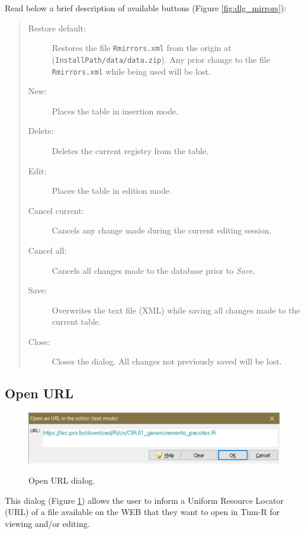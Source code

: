 Read below a brief description of available buttons (Figure \ref{fig:dlg_mirrors}):

\begin{quote}
  \begin{footnotesize}
    \begin{description}
      \item[Restore default:]
        Restores the file \texttt{Rmirrors.xml} from the origin at
        (\texttt{InstallPath/data/data.zip}). Any prior change to the
        file \texttt{Rmirrors.xml} while being used will be lost.
      \item[New:]
        Places the table in insertion mode.
      \item[Delete:]
        Deletes the current registry from the table.
      \item[Edit:]
        Places the table in edition mode.
      \item[Cancel current:]
        Cancels any change made during the current editing session.
      \item[Cancel all:]
        Cancels all changes made to the database prior to \textit{Save}.
      \item[Save:]
        Overwrites the text file (XML) while saving all changes made to the current table.
      \item[Close:]
        Closes the dialog. All changes not previously saved will be lost.
    \end{description}
  \end{footnotesize}
\end{quote}


\hypertarget{dlg_open_url}{}
\subsection{Open URL}

\begin{figure}[H]
  \includegraphics[scale=1]{./res/dlg_open_url.png} \\
  \caption{Open URL dialog.}
  \label{fig:dlg_open_url}
\end{figure}
This dialog
(Figure \ref{fig:dlg_open_url})
allows the user to inform a Uniform Resource Locator (URL) of a file available on the WEB
that they want to open in Tinn-R for viewing and/or editing.

